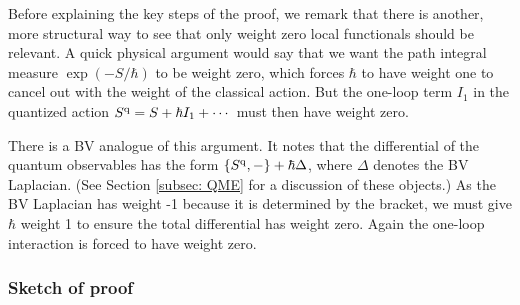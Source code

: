
Before explaining the key steps of the proof, 
we remark that there is another, more structural way to see that only weight zero local functionals should be relevant.
A quick physical argument would say that we want the path integral measure $\exp(-S/\hbar)$ to be weight zero,
which forces $\hbar$ to have weight one to cancel out with the weight of the classical action.
But the one-loop term $I_1$ in the quantized action $S^{\rm q} = S + \hbar I_1 + \cdots$ must then have weight zero.

There is a BV analogue of this argument.
It notes that the differential of the quantum observables has the form $\{S^{\rm q},-\} + \hbar \Delta$,
where $\Delta$ denotes the BV Laplacian.
(See Section \ref{subsec: QME} for a discussion of these objects.)
As the BV Laplacian has weight -1 because it is determined by the bracket,
we must give $\hbar$ weight 1 to ensure the total differential has weight zero.
Again the one-loop interaction is forced to have weight zero.


\subsubsection{Sketch of proof}

